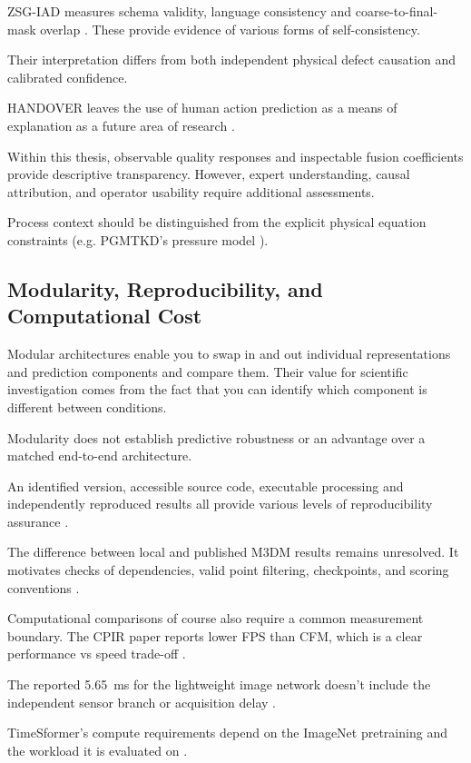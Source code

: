 ZSG-IAD measures schema validity, language consistency and coarse-to-final-mask overlap
\citep{P025}. These provide evidence of various forms of self-consistency.

Their interpretation differs from both independent physical defect causation and calibrated
confidence.

HANDOVER leaves the use of human action prediction as a means of explanation as a future area of
research \citep{Thoduka2024Handover}.

Within this thesis, observable quality responses and inspectable fusion coefficients provide
descriptive transparency. However, expert understanding, causal attribution, and operator usability
require additional assessments.

Process context should be distinguished from the explicit physical equation constraints (e.g.
PGMTKD's pressure model \citep{Li2025PGMTKD}).

\subsection{Modularity, Reproducibility, and Computational Cost}

Modular architectures enable you to swap in and out individual representations and prediction
components and compare them. Their value for scientific investigation comes from the fact that you
can identify which component is different between conditions.

Modularity does not establish predictive robustness or an advantage over a matched end-to-end
architecture.

An identified version, accessible source code, executable processing and independently reproduced
results all provide various levels of reproducibility assurance \citep{P009}.

The difference between local and published M3DM results remains unresolved. It motivates checks of
dependencies, valid point filtering, checkpoints, and scoring conventions \citep{P033}.

Computational comparisons of course also require a common measurement boundary. The CPIR paper
reports lower FPS than CFM, which is a clear performance vs speed trade-off
\citep{Shangguan2025CPIR}.

The reported 5.65~ms for the lightweight image network doesn't include the independent sensor branch
or acquisition delay \citep[PDF p.~10, Table~V]{P035}.

TimeSformer's compute requirements depend on the ImageNet pretraining and the workload it is
evaluated on \citep{P034}.

